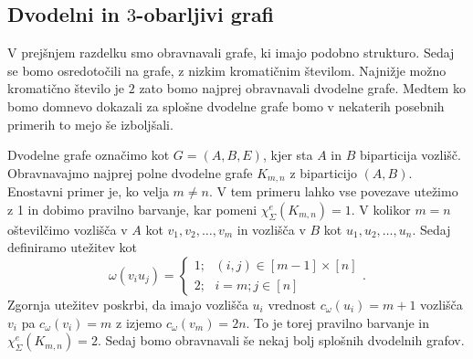\documentclass[12pt,a4paper,twoside]{article}
\theoremstyle{definition} %
\theoremstyle{plain} %
\newcommand{\ec}{\chi_{\Sigma}^e}
\numberwithin{equation}{section}  %
\begin{document}
 \subsection{Dvodelni in $3$-obarljivi grafi}
V prejšnjem razdelku smo obravnavali grafe, ki imajo podobno strukturo. Sedaj se bomo osredotočili na grafe, z nizkim kromatičnim številom. Najnižje možno kromatično število je $2$ zato bomo najprej obravnavali dvodelne grafe. Medtem ko bomo domnevo dokazali za splošne dvodelne grafe bomo v nekaterih posebnih primerih to mejo še izboljšali.

 
 Dvodelne grafe označimo kot $G=(A, B, E)$, kjer sta $A$ in $B$ biparticija vozlišč.
Obravnavajmo najprej polne dvodelne grafe $K_{m,n}$ z biparticijo $(A, B)$. Enostavni primer je, ko velja $m \neq n$. V tem primeru lahko vse povezave utežimo z 1 in dobimo pravilno barvanje, kar pomeni $\ec(K_{m,n}) = 1$. V kolikor $m=n$ oštevilčimo vozlišča v $A$ kot $v_1, v_2, \ldots, v_m$ in vozlišča v $B$ kot $u_1, u_2, \ldots, u_n$. Sedaj definiramo utežitev kot
$$
\omega(v_i u_j) = 
\begin{cases}
1 ; \text { } (i, j) \in [m-1] \times [n] \\
2; \text{ } i=m; j \in [n]
\end{cases}.
$$
Zgornja utežitev poskrbi, da imajo vozlišča $u_i$ vrednost $c_{\omega}(u_i) = m + 1$ vozlišča $v_i$ pa $c_{\omega}(v_i) = m$ z izjemo $c_{\omega}(v_m) = 2n$. To je torej pravilno barvanje in $\ec(K_{m,n}) = 2$. Sedaj bomo obravnavali še nekaj bolj splošnih dvodelnih grafov.
\end{document}

